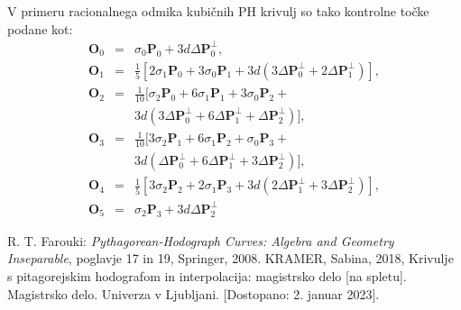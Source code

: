 \documentclass[12pt]{article}
\begin{document}
V primeru racionalnega odmika kubičnih PH krivulj so tako kontrolne točke podane kot:
\begin{eqnarray}
	\textbf{O}_0 &=& \sigma_0 \textbf{P}_0 + 3 d \Delta \textbf{P}_0^{\perp},\nonumber \\
	\textbf{O}_1 &=& \frac{1}{5} [2 \sigma_1 \textbf{P}_0 + 3\sigma_0 \textbf{P}_1 + 3 d (3 \Delta \textbf{P}_0^{\perp} + 2 \Delta \textbf{P}_1^{\perp})],\nonumber \\
	\textbf{O}_2 &=& \frac{1}{10} [\sigma_2 \textbf{P}_0 + 6\sigma_1 \textbf{P}_1 + 3\sigma_0 \textbf{P}_2 + \nonumber \\
		& & 3 d (3 \Delta \textbf{P}_0^{\perp} + 6 \Delta \textbf{P}_1^{\perp} + \Delta \textbf{P}_2^{\perp})],\nonumber \\
	\textbf{O}_3 &=& \frac{1}{10} [3\sigma_2 \textbf{P}_1 + 6\sigma_1 \textbf{P}_2 + \sigma_0 \textbf{P}_3 + \nonumber \\
		& & 3 d (\Delta \textbf{P}_0^{\perp} + 6 \Delta \textbf{P}_1^{\perp} + 3 \Delta \textbf{P}_2^{\perp})],\nonumber \\
	\textbf{O}_4 &=& \frac{1}{5} [3\sigma_2 \textbf{P}_2 + 2\sigma_1 \textbf{P}_3 + 3 d (2\Delta \textbf{P}_1^{\perp} + 3 \Delta \textbf{P}_2^{\perp})],\nonumber \\
	\textbf{O}_5 &=& \sigma_2 \textbf{P}_3 + 3 d \Delta \textbf{P}_2^{\perp}\nonumber
\end{eqnarray}
\pagebreak

\begin{thebibliography}{1}
	 R. T. Farouki: \textit{Pythagorean-Hodograph Curves: Algebra and Geometry Inseparable}, poglavje 17 in 19, Springer, 2008.
	 KRAMER, Sabina, 2018, Krivulje s pitagorejskim hodografom in interpolacija: magistrsko delo [na spletu]. Magistrsko delo. Univerza v Ljubljani. [Dostopano: 2. januar 2023].

\end{thebibliography}
\end{document}
